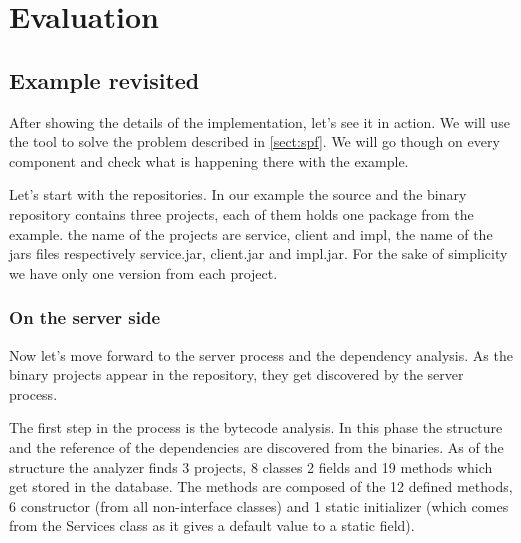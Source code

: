 \chapter{Evaluation}

\section{Example revisited}

After showing the details of the implementation, let's see it in action.
We will use the tool to solve the problem described in \autoref{sect:spf}. We
will go though on every component and check what is happening there with the
example. 

Let's start with the repositories. In our example the source and the binary
repository contains three projects, each of them holds one package from the
example. the name of the projects are service, client and impl, the name of 
the jars files respectively service.jar, client.jar and impl.jar. For the sake
of simplicity we have only one version from each project. 

\subsection{On the server side}


Now let's move forward to the server process and the dependency analysis. As 
the binary projects appear in the repository, they get discovered by the 
server process. 

The first step in the process is the bytecode analysis. In this phase the
structure and the reference of the dependencies are discovered from the
binaries. As of the structure the analyzer finds 3 projects, 8 classes 2 fields
and 19 methods which get stored in the database.
The methods are composed of the 12 defined methods, 6 constructor (from all
non-interface classes) and 1 static initializer (which comes from the Services
class as it gives a default value to a static field). 

